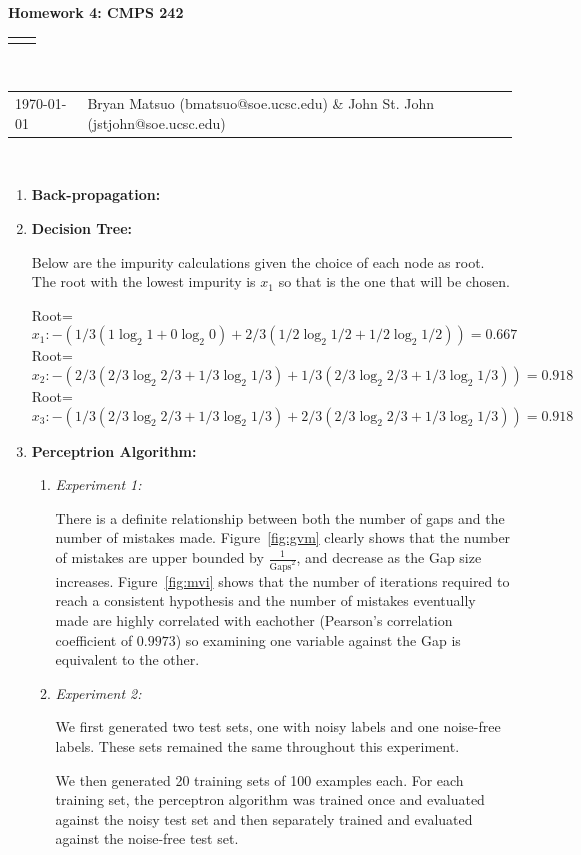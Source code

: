 \documentclass[12pt]{article}
\renewcommand{\title}[1]{\textbf{#1}\\}
\renewcommand{\line}{\begin{tabularx}{\textwidth}{X>{\raggedleft}X}\hline\\\end{tabularx}\\[-0.5cm]}
\newcommand{\leftright}[2]{\begin{tabularx}{\textwidth}{X>{\raggedleft}X}#1%
& #2\\\end{tabularx}\\[-0.5cm]}
\begin{document}
\title{Homework 4: CMPS 242}
\line
\leftright{\today}{Bryan Matsuo (bmatsuo@soe.ucsc.edu) \& John St. John (jstjohn@soe.ucsc.edu)} %
\begin{enumerate}
\item \textbf{Back-propagation:}



\item \textbf{Decision Tree:}

Below are the impurity calculations given the choice of each node as root. The root with the lowest impurity is $x_1$ so that is the one that will be chosen.

Root=\[x_1: -\left(1/3\left(1\log_2 1 + 0\log_2 0 \right)+ 2/3 \left( 1/2\log_2 1/2 + 1/2\log_2 1/2\right)\right) = 0.667\]
Root=\[x_2: -\left(2/3\left( 2/3\log_2 2/3 + 1/3\log_2 1/3 \right) + 1/3 \left( 2/3\log_2 2/3 + 1/3\log_2 1/3 \right) \right)= 0.918 \]
Root=\[x_3: -\left(1/3\left( 2/3\log_2 2/3 + 1/3\log_2 1/3\right) + 2/3 \left( 2/3\log_2 2/3 + 1/3\log_2 1/3 \right)\right) =  0.918 \]


\item \textbf{Perceptrion Algorithm:}

\begin{enumerate}
\item \textit{Experiment 1:}

There is a definite relationship between both the number of gaps and the number of mistakes made. Figure~\ref{fig:gvm} clearly shows that the number of mistakes are upper bounded by $\frac{1}{\text{Gaps}^2}$, and decrease as the Gap size increases. Figure~\ref{fig:mvi} shows that the number of iterations required to reach a consistent hypothesis and the number of mistakes eventually made are highly correlated with eachother (Pearson's correlation coefficient of $0.9973$) so examining one variable against the Gap is equivalent to the other.



\item \textit{Experiment 2:}

We first generated two test sets, one with noisy labels and one noise-free
labels. These sets remained the same throughout this experiment.

We then generated 20 training sets of 100 examples each. For each training
set, the perceptron algorithm was trained once and evaluated against the
noisy test set and then separately trained and evaluated against the
noise-free test set.


\end{enumerate}
\end{enumerate}
\end{document}
